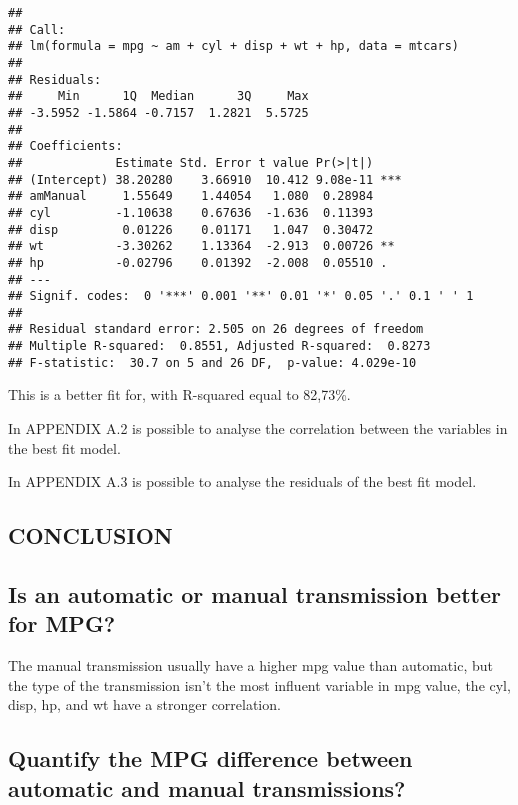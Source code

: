 \documentclass[]{article}
\begin{document}
\begin{verbatim}
## 
## Call:
## lm(formula = mpg ~ am + cyl + disp + wt + hp, data = mtcars)
## 
## Residuals:
##     Min      1Q  Median      3Q     Max 
## -3.5952 -1.5864 -0.7157  1.2821  5.5725 
## 
## Coefficients:
##             Estimate Std. Error t value Pr(>|t|)    
## (Intercept) 38.20280    3.66910  10.412 9.08e-11 ***
## amManual     1.55649    1.44054   1.080  0.28984    
## cyl         -1.10638    0.67636  -1.636  0.11393    
## disp         0.01226    0.01171   1.047  0.30472    
## wt          -3.30262    1.13364  -2.913  0.00726 ** 
## hp          -0.02796    0.01392  -2.008  0.05510 .  
## ---
## Signif. codes:  0 '***' 0.001 '**' 0.01 '*' 0.05 '.' 0.1 ' ' 1
## 
## Residual standard error: 2.505 on 26 degrees of freedom
## Multiple R-squared:  0.8551, Adjusted R-squared:  0.8273 
## F-statistic:  30.7 on 5 and 26 DF,  p-value: 4.029e-10
\end{verbatim}

This is a better fit for, with R-squared equal to 82,73\%.

In APPENDIX A.2 is possible to analyse the correlation between the
variables in the best fit model.

In APPENDIX A.3 is possible to analyse the residuals of the best fit
model.

\hypertarget{conclusion}{%
\subsection{CONCLUSION}\label{conclusion}}

\hypertarget{is-an-automatic-or-manual-transmission-better-for-mpg}{%
\subsection{Is an automatic or manual transmission better for
MPG?}\label{is-an-automatic-or-manual-transmission-better-for-mpg}}

The manual transmission usually have a higher mpg value than automatic,
but the type of the transmission isn't the most influent variable in mpg
value, the cyl, disp, hp, and wt have a stronger correlation.

\hypertarget{quantify-the-mpg-difference-between-automatic-and-manual-transmissions}{%
\subsection{Quantify the MPG difference between automatic and manual
transmissions?}\label{quantify-the-mpg-difference-between-automatic-and-manual-transmissions}}
\end{document}
